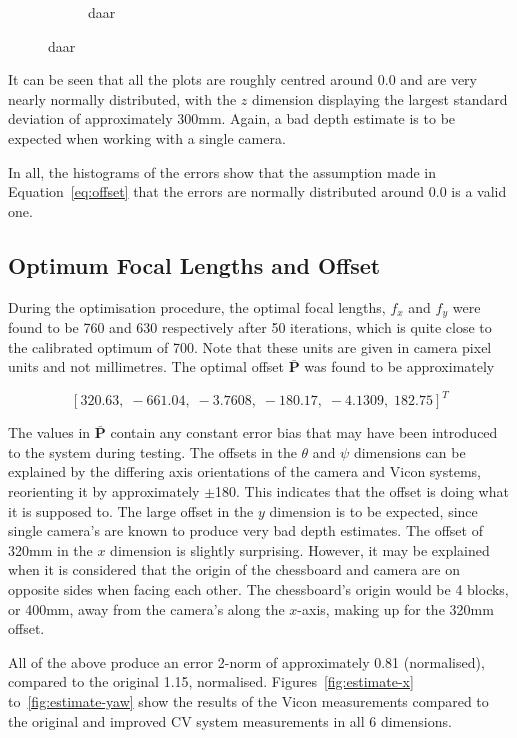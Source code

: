 \begin{figure}
\begin{subfigure}{0.45\textwidth}
     \caption{daar}
  \label{fig:norm-yaw}
  \end{subfigure}
\end{figure}

It can be seen that all the plots are roughly centred around 0.0 and are very nearly normally distributed, with the $z$ dimension displaying the largest standard deviation of approximately 300mm. Again, a bad depth estimate is to be expected when working with a single camera.

In all, the histograms of the errors show that the assumption made in Equation~\ref{eq:offset} that the errors are normally distributed around 0.0 is a valid one. 

\subsection{Optimum Focal Lengths and Offset}

During the optimisation procedure, the optimal focal lengths, $f_x$ and $f_y$ were found to be 760 and 630 respectively after 50 iterations, which is quite close to the calibrated optimum of 700. Note that these units are given in camera pixel units and not millimetres. The optimal offset $\bar{\bm{P}}$ was found to be approximately

\[
  {[320.63,\;-661.04,\;-3.7608,\;-180.17,\;-4.1309,\;182.75]}^T
\]

The values in $\bar{\bm{P}}$ contain any constant error bias that may have been introduced to the system during testing. The offsets in the $\theta$ and $\psi$ dimensions can be explained by the differing axis orientations of the camera and Vicon systems, reorienting it by approximately $\pm$180\degree. This indicates that the offset is doing what it is supposed to. The large offset in the $y$ dimension is to be expected, since single camera's are known to produce very bad depth estimates. The offset of 320mm in the $x$ dimension is slightly surprising. However, it may be explained when it is considered that the origin of the chessboard and camera are on opposite sides when facing each other. The chessboard's origin would be 4 blocks, or 400mm, away from the camera's along the $x$-axis, making up for the 320mm offset.

All of the above produce an error 2-norm of approximately 0.81 (normalised), compared to the original 1.15, normalised. Figures~\ref{fig:estimate-x} to~\ref{fig:estimate-yaw} show the results of the Vicon measurements compared to the original and improved CV system measurements in all 6 dimensions.

